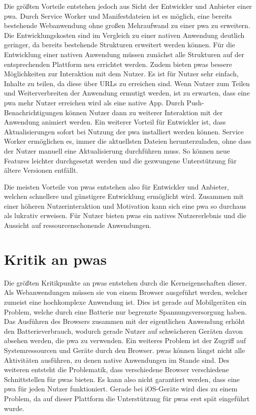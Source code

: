 \documentclass[12pt, parskip=half]{scrartcl}       %
\begin{document}
Die größten Vorteile entstehen jedoch aus Sicht der Entwickler und Anbieter einer \ac{pwa}.
Durch Service Worker und Manifestdateien ist es möglich, eine bereits bestehende Webanwendung ohne großen Mehraufwand zu einer \ac{pwa} zu erweitern.
Die Entwicklungskosten sind im Vergleich zu einer nativen Anwendung deutlich geringer, da bereits bestehende Strukturen erweitert werden können.
Für die Entwicklung einer nativen Anwendung müssen zunächst alle Strukturen auf der entsprechenden Plattform neu errichtet werden.
Zudem bieten \acp{pwa} bessere Möglichkeiten zur Interaktion mit dem Nutzer.
Es ist für Nutzer sehr einfach, Inhalte zu teilen, da diese über URLs zu erreichen sind.
Wenn Nutzer zum Teilen und Weiterverbreiten der Anwendung ermutigt werden, ist zu erwarten, dass eine \ac{pwa} mehr Nutzer erreichen wird als eine native App.
Durch Push-Benachrichtigungen können Nutzer dann zu weiterer Interaktion mit der Anwendung animiert werden.
Ein weiterer Vorteil für Entwickler ist, dass Aktualisierungen sofort bei Nutzung der \ac{pwa} installiert werden können.
Service Worker ermöglichen es, immer die aktuellsten Dateien herunterzuladen, ohne dass der Nutzer manuell eine Aktualisierung durchführen muss.
So können neue Features leichter durchgesetzt werden und die gezwungene Unterstützung für ältere Versionen entfällt.

Die meisten Vorteile von \acp{pwa} entstehen also für Entwickler und Anbieter, welchen schnellere und günstigere Entwicklung ermöglicht wird.
Zusammen mit einer höheren Nutzerinteraktion und Motivation kann sich eine \ac{pwa} so durchaus als lukrativ erweisen.
Für Nutzer bieten \acp{pwa} ein natives Nutzererlebnis und die Aussicht auf ressourcenschonende Anwendungen.


\newpage

\section{Kritik an \acp{pwa}}
\label{sec:nachteile}

Die größten Kritikpunkte an \acp{pwa} entstehen durch die Kerneigenschaften dieser.
Als Webanwendungen müssen sie von einem Browser ausgeführt werden, welcher zumeist eine hochkomplexe Anwendung ist.
Dies ist gerade auf Mobilgeräten ein Problem, welche durch eine Batterie nur begrenzte Spannungsversorgung haben.
Das Ausführen des Browsers zusammen mit der eigentlichen Anwendung erhöht den Batterieverbrauch, wodurch gerade Nutzer auf schwächeren Geräten davon absehen werden, die \ac{pwa} zu verwenden.
Ein weiteres Problem ist der Zugriff auf Systemressourcen und Geräte durch den Browser.
\acp{pwa} können längst nicht alle Aktivitäten ausführen, zu denen native Anwendungen im Stande sind.
Des weiteren entsteht die Problematik, dass verschiedene Browser verschiedene Schnittstellen für \acp{pwa} bieten.
Es kann also nicht garantiert werden, dass eine \ac{pwa} für jeden Nutzer funktioniert.
Gerade bei iOS-Geräte wird dies zu einem Problem, da auf dieser Plattform die Unterstützung für \acp{pwa} erst spät eingeführt wurde.
\end{document}
